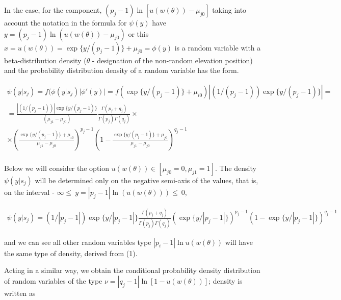 In the case, for the component, $({{p}_{j}}-1)\ln [u(w(\theta ))-{{\mu }_{j0}}]$ taking into account the notation in the formula for $\psi (y)$ have $y=({{p}_{j}}-1)\ln (u(w(\theta ))-{{\mu }_{j0}})$ or this $x=u(w(\theta ))=\exp \{y/({{p}_{j}}-1)\}+{{\mu }_{j0}}=\phi (y)$ is  a random variable with a beta-distribution density ($\theta $ - designation of the non-random elevation position) and the probability distribution density of a random variable has the form.


\begin{equation*}
\begin{gathered}
\psi (y|{{s}_{j}})=f(\phi (y|{{s}_{j}})\left| {\phi }'(y) \right|=f(\exp \{y/({{p}_{j}}-1)\}+{{\mu }_{i0}})\left| (1/({{p}_{j}}-1))\exp \{y/({{p}_{j}}-1)\} \right|= \\ 
  =\frac{\left| (1/({{p}_{j}}-1)) \right|\exp \{y/({{p}_{j}}-1)\}}{({{\mu }_{j1}}-{{\mu }_{j0}})}\frac{\Gamma ({{p}_{j}}+{{q}_{j}})}{\Gamma ({{p}_{j}})\Gamma ({{q}_{j}})} \times \\
\times {{\left( \frac{\exp \{y/({{p}_{j}}-1)\}+{{\mu }_{i0}}}{{{\mu }_{j1}}-{{\mu }_{j0}}} \right)}^{{{p}_{j}}-1}}{{\left( 1-\frac{\exp \{y/({{p}_{j}}-1)\}+{{\mu }_{j0}}}{{{\mu }_{j1}}-{{\mu }_{j0}}} \right)}^{{{q}_{j}}-1}} \\ 
\end{gathered}
\end{equation*}


Below we will consider the option $u(w(\theta ))\in [{{\mu }_{j0}}=0,{{\mu }_{j1}}=1]$. The density $\psi (y|{{s}_{j}})$ will be determined only on the negative semi-axis of the values, that is, on the interval - $\infty \le \ y=\left| {{p}_{j}}-1 \right|\ln (u(w(\theta )))\le \ 0$,

\begin{equation*}
\begin{gathered}
\psi (\left. y \right|{{s}_{j}})=(1/\left| {{p}_{j}}-1 \right|)\exp \{y/\left| {{p}_{j}}-1 \right|\}\frac{\Gamma ({{p}_{j}}+{{q}_{j}})}{\Gamma ({{p}_{j}})\Gamma ({{q}_{j}})}{{\left( \exp \{y/\left| {{p}_{j}}-1 \right|\} \right)}^{{{p}_{j}}-1}}{{\left( 1-\exp \{y/\left| {{p}_{j}}-1 \right|\} \right)}^{{{q}_{j}}-1}}
\end{gathered}
\end{equation*}

and we can see all other random variables type $\left| {{p}_{i}}-1 \right|\ln u(w(\theta ))$ will have the same type of density, derived from (1).

Acting in a similar way, we obtain the conditional probability density distribution of random variables of the type $\nu =\left| {{q}_{j}}-1 \right|\ln [1-u(w(\theta ))]$; density is written as

